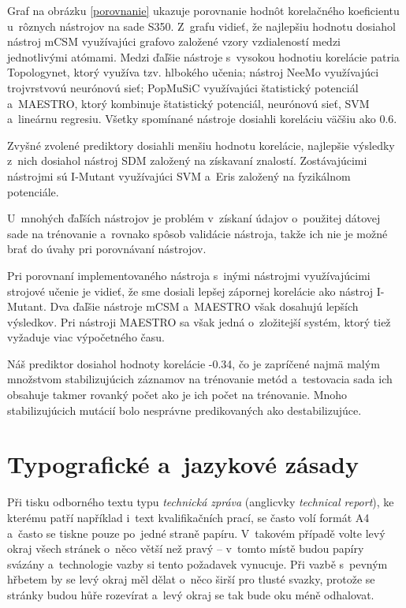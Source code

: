 Graf na obrázku \ref{porovnanie} ukazuje porovnanie hodnôt korelačného koeficientu u~rôznych nástrojov na sade S350. Z~grafu vidieť, že najlepšiu hodnotu dosiahol nástroj mCSM využívajúci grafovo založené vzory vzdialeností medzi jednotlivými atómami. Medzi ďaľšie nástroje s~vysokou hodnotiu korelácie patria Topologynet, ktorý využíva tzv. hlbokého učenia; nástroj NeeMo využívajúci trojvrstvovú neurónovú sieť; PopMuSiC využívajúci štatistický potenciál a~MAESTRO, ktorý kombinuje štatistický potenciál, neurónovú sieť, SVM a~lineárnu regresiu. Všetky spomínané nástroje dosiahli koreláciu väčšiu ako 0.6.

Zvyšné zvolené prediktory dosiahli menšiu hodnotu korelácie, najlepšie výsledky z~nich dosiahol nástroj SDM založený na získavaní znalostí. Zostávajúcimi nástrojmi sú I-Mutant využívajúci SVM a~Eris založený na fyzikálnom potenciále.

U~mnohých ďaľších nástrojov je problém v~získaní údajov o~použitej dátovej sade na trénovanie a~rovnako spôsob validácie nástroja, takže ich nie je možné brať do úvahy pri porovnávaní nástrojov.

Pri porovnaní implementovaného nástroja s~inými nástrojmi využívajúcimi strojové učenie je vidieť, že sme dosiali lepšej zápornej korelácie ako nástroj I-Mutant. Dva ďaľšie nástroje mCSM a~MAESTRO však dosahujú lepších výsledkov. Pri nástroji MAESTRO sa však jedná o~zložitejší systém, ktorý tiež vyžaduje viac výpočetného času. 

Náš prediktor dosiahol hodnoty korelácie -0.34, čo je zapríčené najmä malým množstvom stabilizujúcich záznamov na trénovanie metód a~testovacia sada ich obsahuje takmer rovanký počet ako je ich počet na trénovanie. Mnoho stabilizujúcich mutácií bolo nesprávne predikovaných ako destabilizujúce. 









\chapter{Typografické a~jazykové zásady}
Při tisku odborného textu typu {\it technická zpráva} (anglicvky {\it technical report}), ke kterému patří například i~text kvalifikačních prací, se často volí formát A4 a~často se tiskne pouze po~jedné straně papíru. V~takovém případě volte levý okraj všech stránek o~něco větší než pravý -- v~tomto místě budou papíry svázány a~technologie vazby si tento požadavek vynucuje. Při vazbě s~pevným hřbetem by se levý okraj měl dělat o~něco širší pro tlusté svazky, protože se stránky budou hůře rozevírat a~levý okraj se tak bude oku méně odhalovat.

